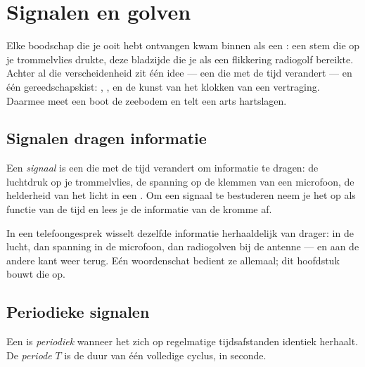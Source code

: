 \chapter{Signalen en golven}\label{ch:g10:signals-and-waves}

Elke boodschap die je ooit hebt ontvangen kwam binnen als een :
een stem die op je trommelvlies drukte, deze bladzijde die je als een
flikkering radiogolf bereikte. Achter al die verscheidenheid zit één
idee --- een  die met de tijd verandert --- en
één gereedschapskist: , ,  en de kunst van het
klokken van een vertraging. Daarmee meet een boot de zeebodem en telt een
arts hartslagen.

\section{Signalen dragen informatie}

\begin{definition}[Signaal]\label{def:g10:signals-and-waves:signal}
Een \emph{signaal} is een  die met
de tijd verandert om informatie te dragen: de luchtdruk op je
trommelvlies, de spanning op de klemmen van een microfoon, de helderheid
van het licht in een . Om een signaal te bestuderen neem je het
op als functie van de tijd en lees je de informatie van de kromme af.
\end{definition}

In een telefoongesprek wisselt dezelfde informatie herhaaldelijk van
drager:  in de lucht, dan spanning in de microfoon, dan radiogolven
bij de antenne --- en aan de andere kant weer terug. Eén woordenschat
bedient ze allemaal; dit hoofdstuk bouwt die op.

\section{Periodieke signalen}

\begin{definition}\label{def:g10:signals-and-waves:period}
Een  is \emph{periodiek} wanneer het zich
op regelmatige tijdsafstanden identiek herhaalt. De
\emph{periode} $T$ is de duur van één volledige cyclus, in
seconde.
\end{definition}

